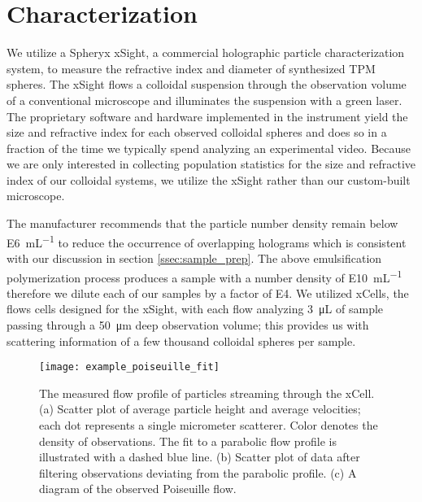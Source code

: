 \section{Characterization}

We utilize a Spheryx xSight, a commercial holographic particle characterization system,
to measure the  refractive index and diameter of synthesized TPM spheres.
The xSight flows a colloidal suspension through the observation volume of a conventional microscope
and illuminates the suspension with a green laser.
The proprietary software and hardware implemented in
the instrument yield the size and refractive index for each observed colloidal spheres and
does so in a fraction of the time we typically spend analyzing an experimental video.
Because we are only interested in collecting population statistics for the size and refractive
index of our colloidal systems, we utilize the xSight rather than our custom-built microscope.

The manufacturer recommends that the particle number density remain below 
\SI{E6}{\milli\liter^{-1}} to reduce the occurrence of overlapping holograms
which is consistent with our discussion in section \ref{ssec:sample_prep}.
The above emulsification polymerization process produces a sample with a number
density of \SI{E10}{\milli\liter^{-1}} therefore we dilute each of our samples
by a factor of \SI{E4}{}. We utilized xCells, the flows cells
designed for the xSight, with each flow analyzing \SI{3}{\micro\liter} of sample
passing through a \SI{50}{\um} deep observation volume;
this provides us with scattering information of a few thousand colloidal spheres per sample.

\begin{figure}
    \centering
    \texttt{[image: example\_poiseuille\_fit]}
    \caption{The measured flow profile of particles streaming through the xCell.
      (a) Scatter plot of average particle height and average velocities; each
      dot represents a single micrometer scatterer. Color denotes the density of
      observations. The fit to a parabolic flow profile is illustrated with a dashed
      blue line. (b) Scatter plot of data after filtering observations deviating
      from the parabolic profile. (c) A diagram of the observed Poiseuille flow.\protect\footnotemark
    }
    \label{fig:flow_prof}
\end{figure}

